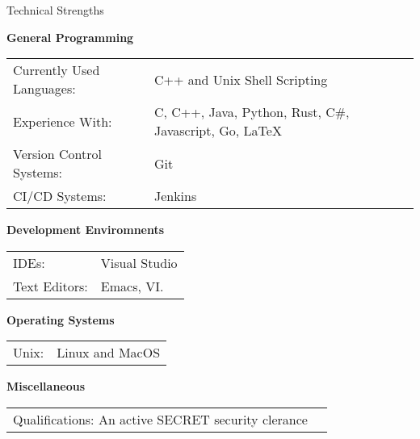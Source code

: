 \documentclass{resume} %
\newcommand{\btab}[2]{
  \bgroup
  \def\arraystretch{#1}
  \begin{tabular}{#2}
}
\newcommand{\etab}{
  \end{tabular} \smallskip
  \egroup
}
\begin{document}




\begin{rSection}{Technical Strengths}

  {\bf General Programming}

  \btab{1.1}{ l l }
  Currently Used Languages: & C++ and Unix Shell Scripting \\
  Experience With: & C, C++, Java, Python, Rust, C\#, Javascript, Go, \LaTeX \\
  Version Control Systems: & Git \\
  CI/CD Systems: & Jenkins \\
  \etab

  {\bf Development Enviromnents}

  \btab{1.1}{ l l }
  IDEs: & Visual Studio \\
  Text Editors: & Emacs, VI. \\
  \etab

  {\bf Operating Systems}

  \btab{1.1}{ l l }
  Unix: & Linux and MacOS
  \etab

  {\bf Miscellaneous}

  \btab{1.1}{ l l }
  Qualifications: An active SECRET security clerance
  \etab

\end{rSection}
\end{document}
